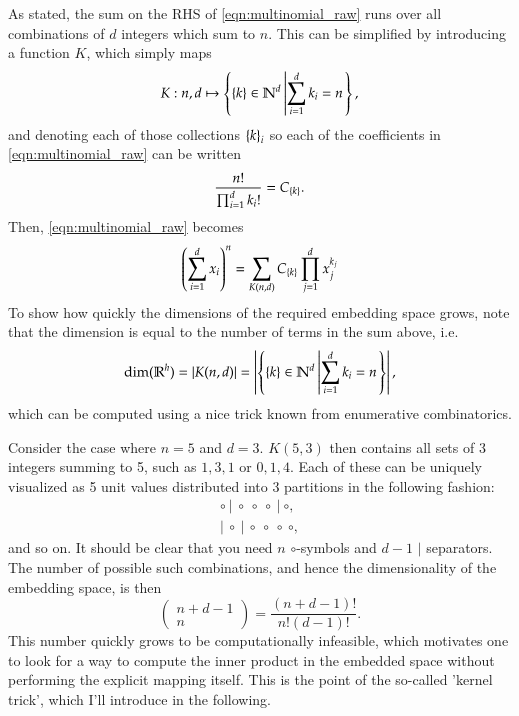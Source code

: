 As stated, the sum on the RHS of \eqref{eqn:multinomial_raw} runs over all combinations of $d$ integers which sum to $n$.
This can be simplified by introducing a function $K$, which simply maps
\begin{equation}
	K: n,d \mapsto \left\{ \left\{ k \right\} \in \mathbb{N}^d \left| \sum_{i=1}^d k_i = n \right. \right\}, 
\end{equation}
and denoting each of those collections $\left\{ k \right\}_i$ so each of the coefficients in \eqref{eqn:multinomial_raw} can be written
\begin{equation}
	\frac{n!}{\prod_{i=1}^dk_i!} = C_{\left\{ k \right\}}.
\end{equation}
Then, \eqref{eqn:multinomial_raw} becomes
\begin{equation}
	\left( \sum_{i=1}^d x_i \right)^n = \sum_{K(n,d)} C_{\left\{ k \right\}} \prod_{j = 1}^d x_j^{k_j} \label{eqn:multinomial_smart}
\end{equation}
To show how quickly the dimensions of the required embedding space grows, note that the dimension is equal to the number of terms in the sum above, i.e.
\begin{equation}
	\mathrm{dim}(\mathbb{R}^h) = \left| K(n,d) \right| = \left| \left\{ \left\{ k \right\} \in \mathbb{N}^d \left| \sum_{i=1}^d k_i = n \right. \right\} \right|,
\end{equation}
which can be computed using a nice trick known from enumerative combinatorics.

Consider the case where $n=5$ and $d=3$. $K(5,3)$ then contains all sets of 3 integers summing to 5, such as $1,3,1$ or $0,1,4$. Each of these can be uniquely visualized as 5 unit values distributed into 3 partitions in the following fashion:
\begin{align*}
	\circ~|~\circ~\circ~\circ~|~\circ, \\
	|~\circ~|~\circ~\circ~\circ~\circ,
\end{align*}
and so on. It should be clear that you need $n$ $\circ$-symbols and $d-1$ $|$ separators. The number of possible such combinations, and hence the dimensionality of the embedding space, is then
\begin{equation}
	\begin{pmatrix}
		n + d - 1 \\ n
	\end{pmatrix}
	= \frac{(n+d-1)!}{n!(d-1)!}.
\end{equation}
This number quickly grows to be computationally infeasible, which motivates one to look for a way to compute the inner product in the embedded space without performing the explicit mapping itself. This is the point of the so-called 'kernel trick', which I'll introduce in the following.


